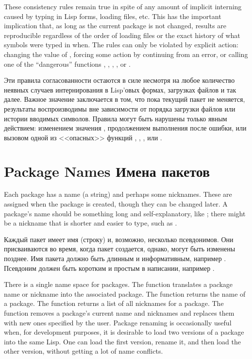 These consistency rules remain true in spite of any amount of implicit
interning caused by typing in Lisp forms, loading files, etc.  This has
the important implication that, as long as the current package
is not changed, results are reproducible regardless of
the order of loading files or the exact history of what symbols were
typed in when.  The rules can only be violated by explicit action:
changing the value of , forcing some action by continuing
from an error, or calling one of the ``dangerous'' functions
, , ,
, or .

Эти правила согласованности остаются в силе несмотря на любое количество неявных
случаев интернирования в Lisp'овых формах, загрузках файлов и так далее. Важное
значение заключается в том, что пока текущий пакет не меняется, результаты
воспроизводимы вне зависимости от порядка загрузки файлов или истории вводимых
символов. Правила могут быть нарушены только явным действием: изменением
значения , продолжением выполнения после ошибки, или вызовом
одной из <<опасных>> функций , , ,
 или . 

\section{Package Names Имена пакетов}
\label{PACKAGE-NAMES-SECTION}

Each package has a name (a string) and perhaps some nicknames.  These
are assigned when the package is created, though they can be changed
later.  A package's name should be something long and self-explanatory,
like ; there might be a nickname that is shorter and easier to
type, such as .

Каждый пакет имеет имя (строку) и, возможно, несколько псевдонимов. Они
присваиваются во время, когда пакет создается, однако, могут быть изменены
позднее. Имя пакета должно быть длинным и информативным, например
. Псевдоним должен быть коротким и простым в написании, например
.

There is a single name space for packages.  The function
 translates a package name or nickname into the
associated package.  The function  returns the name of a
package.  The function  returns a list of all
nicknames for a package.  The function  removes a
package's current name and nicknames and replaces them with new ones
specified by the user.  Package renaming is occasionally useful when, for
development purposes, it is desirable to load two versions of a package
into the same Lisp.  One can load the first version, rename it,
and then load the other version, without getting a lot of name conflicts.

